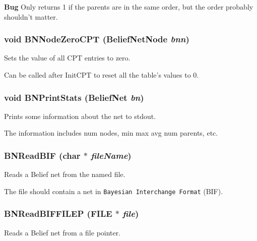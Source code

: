\begin{Desc}
\item[{\bf Bug}]Only returns 1 if the parents are in the same order, but the order probably shouldn't matter. \end{Desc}
\subsubsection{\setlength{\rightskip}{0pt plus 5cm}void BNNode\-Zero\-CPT ({\bf Belief\-Net\-Node} {\em bnn})}\label{BeliefNet_8h_a26}


Sets the value of all CPT entries to zero. 

Can be called after Init\-CPT to reset all the table's values to 0. 
\subsubsection{\setlength{\rightskip}{0pt plus 5cm}void BNPrint\-Stats ({\bf Belief\-Net} {\em bn})}\label{BeliefNet_8h_a77}


Prints some information about the net to stdout. 

The information includes num nodes, min max avg num parents, etc. 
\subsubsection{ BNRead\-BIF (char $\ast$ {\em file\-Name})}\label{BeliefNet_8h_a74}


Reads a Belief net from the named file. 

The file should contain a net in {\tt Bayesian Interchange Format} (BIF). 
\subsubsection{ BNRead\-BIFFILEP (FILE $\ast$ {\em file})}\label{BeliefNet_8h_a75}


Reads a Belief net from a file pointer. 

